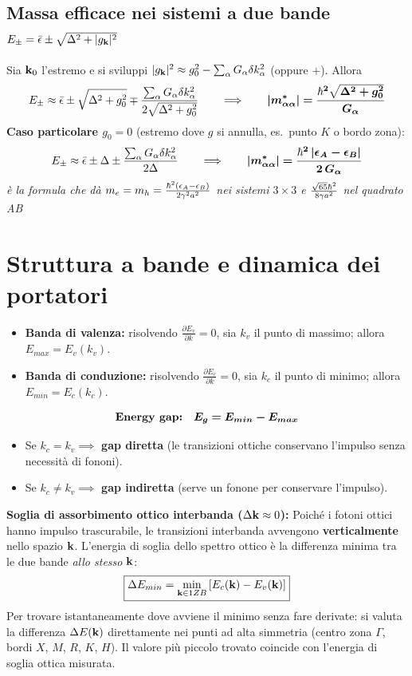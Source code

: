 \subsection{Massa efficace nei sistemi a due bande $E_\pm = \bar\epsilon\pm\sqrt{\Delta^2+|g_{\mathbf{k}}|^2}$}
Sia $\mathbf{k}_0$ l'estremo e si sviluppi $|g_{\mathbf{k}}|^2 \approx g_0^2 - \sum_\alpha G_\alpha \delta k_\alpha^2$ (oppure $+$). Allora
\[ E_\pm \approx \bar\epsilon \pm\sqrt{\Delta^2+g_0^2} \mp \frac{\sum_\alpha G_\alpha\delta k_\alpha^2}{2\sqrt{\Delta^2+g_0^2}}
   \qquad\Longrightarrow\qquad
   \bm{|m^*_{\alpha\alpha}| = \frac{\hbar^2\sqrt{\Delta^2+g_0^2}}{G_\alpha}} \]
\textbf{Caso particolare $g_0=0$} (estremo dove $g$ si annulla, es.\ punto $K$ o bordo zona):
\[ E_\pm \approx \bar\epsilon\pm\Delta \pm \frac{\sum_\alpha G_\alpha \delta k_\alpha^2}{2\Delta}
   \qquad\Longrightarrow\qquad
   \bm{|m^*_{\alpha\alpha}| = \frac{\hbar^2\,|\epsilon_A-\epsilon_B|}{2\,G_\alpha}} \]
\textit{è la formula che dà $m_e=m_h=\frac{\hbar^2(\epsilon_A-\epsilon_B)}{2\gamma^2a^2}$ nei sistemi $3\times3$ e $\frac{\sqrt{65}\hbar^2}{8\gamma a^2}$ nel quadrato AB}

\newpage

\section{Struttura a bande e dinamica dei portatori}
\begin{itemize}
    \item \textbf{Banda di valenza:} risolvendo $\frac{\partial E_v}{\partial k}=0$, sia $k_v$ il punto di massimo; allora $E_{max}=E_v(k_v)$.
    \item \textbf{Banda di conduzione:} risolvendo $\frac{\partial E_c}{\partial k}=0$, sia $k_c$ il punto di minimo; allora $E_{min}=E_c(k_c)$.
\end{itemize}
\[\text{\textbf{Energy gap:}} \quad \bm{E_g = E_{min}-E_{max}}\]
\begin{itemize}
    \item Se $k_c = k_v \implies$ \textbf{gap diretta} (le transizioni ottiche conservano l'impulso senza necessità di fononi).
    \item Se $k_c \neq k_v \implies$ \textbf{gap indiretta} (serve un fonone per conservare l'impulso).
\end{itemize}

\vspace{0.3cm}
\textbf{Soglia di assorbimento ottico interbanda ($\Delta\mathbf{k}\approx0$):} Poiché i fotoni ottici hanno impulso trascurabile, le transizioni interbanda avvengono \textbf{verticalmente} nello spazio $\mathbf{k}$. L'energia di soglia dello spettro ottico è la differenza minima tra le due bande \emph{allo stesso} $\mathbf{k}$:
\[ \boxed{\Delta E_{min} = \min_{\mathbf{k}\in1ZB}\left[E_c(\mathbf{k})-E_v(\mathbf{k})\right]} \]
Per trovare istantaneamente dove avviene il minimo senza fare derivate: si valuta la differenza $\Delta E(\mathbf{k})$ direttamente nei punti ad alta simmetria (centro zona $\Gamma$, bordi $X$, $M$, $R$, $K$, $H$). Il valore più piccolo trovato coincide con l'energia di soglia ottica misurata.

